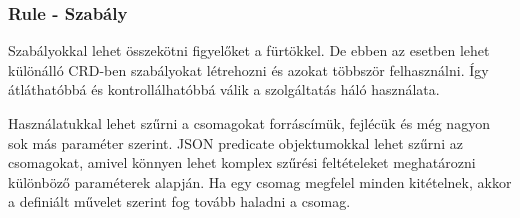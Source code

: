 \subsubsection{Rule - Szabály}

Szabályokkal lehet összekötni figyelőket a fürtökkel. De ebben az esetben lehet különálló
CRD-ben szabályokat létrehozni és azokat többször felhasználni. Így átláthatóbbá és 
kontrollálhatóbbá válik a szolgáltatás háló használata. 

Használatukkal lehet szűrni a csomagokat forráscímük, fejlécük és még nagyon sok más 
paraméter szerint. JSON predicate objektumokkal lehet szűrni az csomagokat, amivel 
könnyen lehet komplex szűrési feltételeket meghatározni különböző paraméterek alapján. Ha 
egy csomag megfelel minden kitételnek, akkor a definiált művelet szerint fog tovább 
haladni a csomag. 